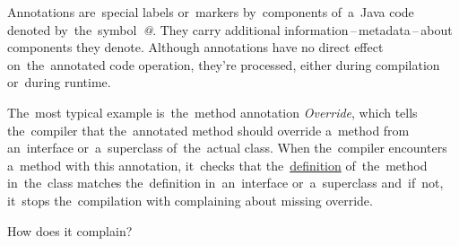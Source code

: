
\label{javaannotation}
Annotations are~special labels or~markers by~components of~a~Java code denoted by~the~symbol~\textquotesingle\textit{@}\textquotesingle. They carry additional information\,--\,metadata\,--\,about components they denote. Although annotations have no direct effect on~the~annotated code operation, they're processed, either during compilation or~during runtime.

The~most typical example is~the~method annotation \textit{Override}, which tells the~compiler that the~annotated method should override a~method from an~interface or~a~superclass of~the~actual class. When the~compiler encounters a~method with this annotation, it~checks that the~\hyperref[declarationdefinition]{definition} of~the~method in~the~class matches the~definition in~an~interface or~a~superclass and~if~not, it~stops the~compilation with complaining about missing override.

\todo How does it complain?

\label{annotationsrepeatable}


\label{reflection}